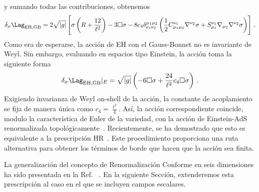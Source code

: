 \documentclass[../Main.tex]{subfiles}
\begin{document}
y sumando todas las contribuciones, obtenemos
\begin{equation}\delta _{\sigma } \Lag_{\rm EH,GB} 
=2 \sqrt{|g|} \left [\sigma  \left(R +\frac{12}{\ell ^{2}}\right) -3  \Box\sigma  -8 c_{4} \delta _{\nu _{1} \nu _{2}}^{\mu _{1} \mu _{2}} \left (\dfrac{1}{2} C_{\mu _{1} \mu _{2}}^{\nu _{1}}  \nabla ^{\nu _{2}}\sigma  +S_{\mu _{1}}^{\nu _{1}}  \nabla _{\mu _{2}} \nabla ^{\nu _{2}}\sigma \right )\right ]\,.
\end{equation}
Como era de esperarse, la acción de EH con el Gauss-Bonnet no es invariante de Weyl. Sin embargo, evaluando en espacios tipo Einstein, la acción toma la siguiente forma 
\begin{equation}
\delta _{\sigma } \Lag_{\rm EH,GB}\vert _{E} =\sqrt{|g|} \left ( -6  \Box\sigma  +\frac{24}{\ell^2} c_{4}  \Box\sigma \right ) \,.
\end{equation}
Exigiendo invarianza de Weyl on-shell de la acción, la constante de acoplamiento se fija de manera única como $c_{4}=\frac{\ell^2}{4}$. Así, la acción correspondiente coincide, modulo la característica de Euler de la variedad, con la acción de Einstein-AdS renormalizada topológicamente~\cite{Miskovic:2009bm}. Recientemente, se ha demostrado que esto es equivalente a la prescripción HR~\cite{Anastasiou:2020zwc}. Este procedimiento proporciona una ruta alternativa para obtener los términos de borde que hacen que la acción sea finita.

La generalización del concepto de Renormalización Conforme en seis dimensiones ha sido presentada en la Ref. ~\cite{Anastasiou:2020mik}. En la siguiente Sección, extenderemos esta prescripción al caso en el que se incluyen campos escalares.










\biblio %
\end{document}
